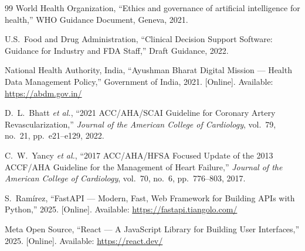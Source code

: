 \documentclass[12pt,a4paper]{article}
\begin{document}
\begin{thebibliography}{99}
World Health Organization, ``Ethics and governance of artificial intelligence for health,'' WHO Guidance Document, Geneva, 2021.

U.S.\ Food and Drug Administration, ``Clinical Decision Support Software: Guidance for Industry and FDA Staff,'' Draft Guidance, 2022.

National Health Authority, India, ``Ayushman Bharat Digital Mission — Health Data Management Policy,'' Government of India, 2021. [Online]. Available: \url{https://abdm.gov.in/}

D.~L.~Bhatt \textit{et al.}, ``2021 ACC/AHA/SCAI Guideline for Coronary Artery Revascularization,'' \textit{Journal of the American College of Cardiology}, vol.~79, no.~21, pp.~e21--e129, 2022.

C.~W.~Yancy \textit{et al.}, ``2017 ACC/AHA/HFSA Focused Update of the 2013 ACCF/AHA Guideline for the Management of Heart Failure,'' \textit{Journal of the American College of Cardiology}, vol.~70, no.~6, pp.~776--803, 2017.

S.~Ram\'irez, ``FastAPI — Modern, Fast, Web Framework for Building APIs with Python,'' 2025. [Online]. Available: \url{https://fastapi.tiangolo.com/}

Meta Open Source, ``React — A JavaScript Library for Building User Interfaces,'' 2025. [Online]. Available: \url{https://react.dev/}

\end{thebibliography}
\end{document}
